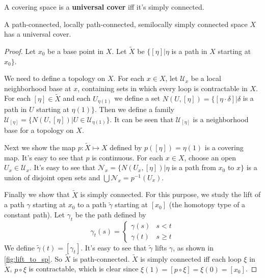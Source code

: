 \documentclass[12pt]{book}
\begin{document}
\begin{definition}
	A covering space is a {\bf universal cover} iff it's simply connected.
\end{definition}

\begin{lemma}
	A path-connected, locally path-connected, semilocally simply connected space $X$ has a universal cover.
\end{lemma}

\begin{proof}
	Let $x_0$ be a base point in $X$. Let $\tilde X$ be $\{[\eta]|\eta$ is a path in $X$ starting at $x_0 \}$. 
	
	We need to define a topology on $X$. For each $x\in X$, let $\mathcal U_x$ be a local neighborhood base at $x$, containing sets in which every loop is contractable in $X$. For each $[\eta]\in \tilde X$ and each $U_{\eta(1)}$ we define a set $N(U,[\eta])=\{[\eta\cdot\delta]|\delta$ is a path in $U$ starting at $\eta(1)\}$. Then we define a family $\mathcal U_{[\eta]}=\{N(U,[\eta])|U\in \mathcal U_{\eta(1)}\}$. It can be seen that $\mathcal U_{[\eta]}$ is a neighborhood base for a topology on $X$.
	
	Next we show the map $p:\tilde X\mapsto X$ defined by $p([\eta])=\eta(1)$ is a covering map. It's easy to see that $p$ is continuous. For each $x\in X$, choose an open $U_x\in\mathcal U_x$. It's easy to see that $\mathcal N_x=\{N(U_x,[\eta])|\eta$ is a path from $x_0$ to $x\}$ is a union of disjoint open sets and $\bigcup \mathcal N_x =p^{-1}(U_x)$.
	
	Finally we show that $\tilde X$ is simply connected. For this purpose, we study the lift of a path $\gamma$ starting at $x_0$ to a path $\tilde \gamma $ starting at $[x_0]$ (the homotopy type of a constant path). Let $\gamma_t$ be the path defined by 
	\begin{equation}
		\gamma_t(s)=\left\{\begin{array} {cc}
		\gamma(s)&s<t\\
		\gamma(t)&s\geq t
		\end{array} \right.
	\end{equation}
	We define $\tilde \gamma(t)=[\gamma_t]$. It's easy to see that $\tilde \gamma$ lifts $\gamma$, as shown in \ref{fig:lift_to_sp}. So $\tilde X$ is path-connected. $\tilde X$ is simply connected iff each loop $\xi$ in $\tilde X$, $p\circ\xi$ is contractable, which is clear since $\xi(1)=[p\circ\xi]=\xi(0)=[x_0]$.
\end{proof}
\end{document}
